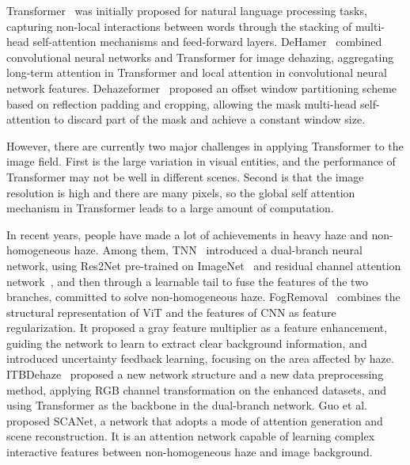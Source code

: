\documentclass[journal]{IEEEtran}
\begin{document}
Transformer~\cite{vaswani2017attention} was initially proposed for natural language processing tasks, capturing non-local interactions between words through the stacking of multi-head self-attention mechanisms and feed-forward layers. DeHamer~\cite{guo2022image} combined convolutional neural networks and Transformer for image dehazing, aggregating long-term attention in Transformer and local attention in convolutional neural network features. Dehazeformer~\cite{song2023vision} proposed an offset window partitioning scheme based on reflection padding and cropping, allowing the mask multi-head self-attention to discard part of the mask and achieve a constant window size.

However, there are currently two major challenges in applying Transformer to the image field. First is the large variation in visual entities, and the performance of Transformer may not be well in different scenes. Second is that the image resolution is high and there are many pixels, so the global self attention mechanism in Transformer leads to a large amount of computation.

In recent years, people have made a lot of achievements in heavy haze and non-homogeneous haze. Among them, TNN~\cite{yu2021two} introduced a dual-branch neural network, using Res2Net pre-trained on ImageNet~\cite{deng2009imagenet} and residual channel attention network~\cite{zhang2018image}, and then through a learnable tail to fuse the features of the two branches, committed to solve non-homogeneous haze. FogRemoval~\cite{jin2022structure} combines the structural representation of ViT\cite{dosovitskiy2020image} and the features of CNN as feature regularization. It proposed a gray feature multiplier as a feature enhancement, guiding the network to learn to extract clear background information, and introduced uncertainty feedback learning, focusing on the area affected by haze. ITBDehaze~\cite{liu2023data} proposed a new network structure and a new data preprocessing method, applying RGB channel transformation on the enhanced datasets, and using Transformer as the backbone in the dual-branch network. Guo et al.~\cite{guo2023scanet} proposed SCANet, a network that adopts a mode of attention generation and scene reconstruction. It is an attention network capable of learning complex interactive features between non-homogeneous haze and image background.
\end{document}
